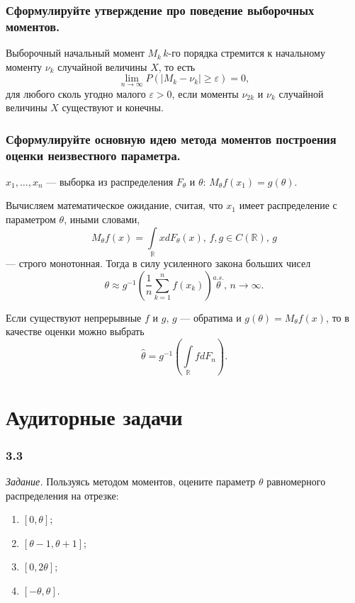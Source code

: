 \subsubsection*{Сформулируйте утверждение про поведение выборочных моментов.}

Выборочный начальный момент $M_k \, k$-го порядка стремится к начальному моменту $ \nu_k$
случайной величины $X$, то есть
$$ \lim \limits_{n \to \infty } P \left( \left| M_k - \nu_k \right| \geq \varepsilon \right) =
  0,$$
для любого сколь угодно малого $ \varepsilon > 0$,
если моменты $ \nu_{2k}$ и $ \nu_k$ случайной величины $X$ существуют и конечны.

\subsubsection*{Сформулируйте основную идею метода моментов построения оценки
                неизвестного параметра.}

$x_1, \dotsc, x_n$ ---
выборка из распределения $F_{ \theta }$ и
$ \theta: \,
  M_{ \theta } f \left( x_1 \right) = g \left( \theta \right) $.

Вычисляем математическое ожидание, считая, что $x_1$ имеет распределение с параметром $ \theta $,
иными словами,
$$M_{ \theta } f \left( x \right) = \int \limits_{ \mathbb{R}} xdF_{ \theta } \left( x \right) , \,
  f, g \in C \left( \mathbb{R} \right), \,
  g$$
--- строго монотонная.
Тогда в силу усиленного закона больших чисел
$$ \theta \approx
  g^{-1} \left( \frac{1}{n} \sum \limits_{k = 1}^n f \left( x_k \right) \right) \overset{a.s.}
  \theta, \,
  n \to \infty.$$

Если существуют непрерывные $f$ и $g, \, g$ ---
обратима и $g \left( \theta \right) = M_{ \theta } f \left( x \right) $,
то в качестве оценки можно выбрать
$$ \hat{ \theta } =
  g^{-1} \left( \int \limits_{ \mathbb{R}} fdF_n \right).$$

\section*{Аудиторные задачи}

\subsubsection*{3.3}

\textit{Задание.}
Пользуясь методом моментов, оцените параметр $ \theta $ равномерного распределения на отрезке:
\begin{enumerate}[label=\alph*)]
  \item $ \left[ 0, \theta \right] $;
  \item $ \left[ \theta - 1, \theta + 1 \right] $;
  \item $ \left[ 0, 2 \theta \right] $;
  \item $ \left[ - \theta, \theta \right] $.
\end{enumerate}


